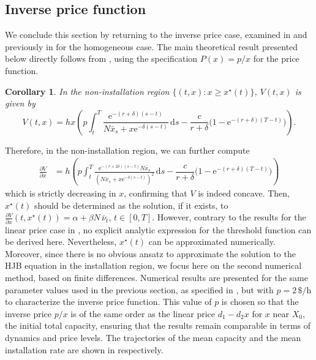 \documentclass[12pt]{article}
\newtheorem{corollary}{Corollary}[section]
\def\erm{\mathrm{e}}
\def\drm{\mathrm{d}}
\begin{document}
\subsection{Inverse price function }\label{inverse_price}
We conclude this section by returning to the inverse price case, examined in \cite{alasseur2023mean} and previously in  for the homogeneous case. The main theoretical result presented below directly follows from , using the specification $P(x) = p/x$ for the price function. 

\begin{corollary}
In the non-installation region $\{(t,x):x\geq x^\star(t)\}$, $V(t,x)$ is given by 
\[
V(t,x) = h x \left( p \int_t^T \frac{ \erm^{-(r+\delta)(s-t)}}{N \bar{x}_s + x  \erm^{-\delta(s - t)}}\,  \drm s - \dfrac{c}{r + \delta} \big( 1 -  \erm^{-(r + \delta)(T - t)} \big) \right).
\]
\end{corollary}

Therefore, in the non-installation region, we can further compute
\begin{align*}
\frac{\partial V}{\partial x}
&=h\left( p \int_t^T \frac{ \erm^{-(r+2\delta)(s-t)}N\bar{x}_s}{(N \bar{x}_s + x  \erm^{-\delta(s - t)})^2}\,  \drm s - \dfrac{c}{r + \delta} \big( 1 -  \erm^{-(r + \delta)(T - t)} \big) \right)
\end{align*}
which is strictly decreasing in $x$, confirming that $V$ is indeed concave. Then, \(x^\star(t)\) should be determined as the solution, if it exists, to $\frac{\partial V}{\partial x} (t, x^\star(t)) = \alpha + \beta N\,\bar{\nu}_t$, $t \in [0,T]$.
However, contrary to the results for the linear price case in , no explicit analytic expression for the threshold function can be derived here. Nevertheless, $x^\star(t)$ can be approximated numerically. Moreover, since there is no obvious ansatz to approximate the solution to the HJB equation in the installation region, we focus here on the second numerical method, based on finite differences. Numerical results are presented for the same parameter values used in the previous section, as specified in , but with \(p = 2\,\$/\text{h}\) to characterize the inverse price function. This value of $p$ is chosen so that the inverse price $p/x$ is of the same order as the linear price $d_1 - d_2 x$ for $x$ near \(X_0\), the initial total capacity, ensuring that the results remain comparable in terms of dynamics and price levels. The trajectories of the mean capacity and the mean installation rate are shown in  respectively.
\end{document}
